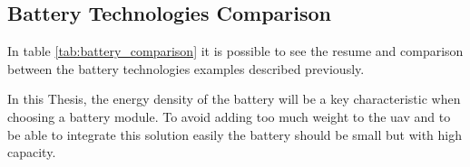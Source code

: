 \subsection{Battery Technologies Comparison}
In table \ref{tab:battery_comparison} it is possible to see the resume and comparison between the battery technologies examples described previously.
\begin{table}[H]
    \centering
    \caption{Comparison of Battery Technologies}
    \label{tab:battery_comparison}
\end{table}

In this Thesis, the energy density of the battery will be a key characteristic when choosing a battery module.
To avoid adding too much weight to the \gls{uav} and to be able to integrate this solution easily the battery should be small but with high capacity.

